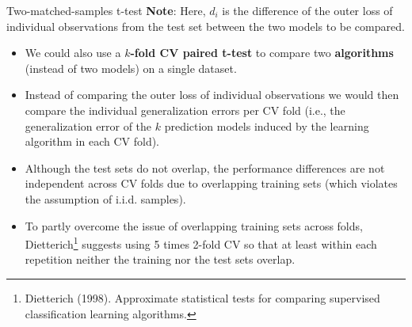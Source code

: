 \begin{vbframe}{Two-matched-samples t-test}
\textbf{Note}: Here, $d_i$ is the difference of the outer loss of individual observations from the test set between the two models to be compared.

\begin{itemize}
\item We could also use a \textbf{$k$-fold CV paired t-test} to compare two \textbf{algorithms} (instead of two models) on a single dataset.
\item Instead of comparing the outer loss of individual observations we would then compare the individual generalization errors per CV fold (i.e., the generalization error of the $k$ prediction models induced by the learning algorithm in each CV fold).
\item Although the test sets do not overlap, the performance differences are not independent across CV folds due to overlapping training sets (which violates the assumption of i.i.d. samples).
\item To partly overcome the issue of overlapping training sets across folds, Dietterich\footnote{Dietterich (1998). Approximate statistical tests for comparing supervised classification learning algorithms.} suggests using 5 times 2-fold CV so that at least within each repetition neither the training nor the test sets overlap.
\end{itemize}
\end{vbframe}


